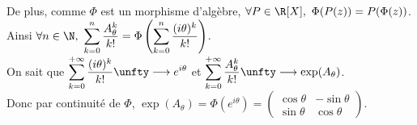 \documentclass[8pt]{book}
\begin{document}
\begin{enumerate}[leftmargin=*]
		De plus, comme $\Phi$ est un morphisme d'algèbre, $\forall P\in \R[X],\ \Phi(P(z))=P(\Phi(z))$. Ainsi $\forall n\in \N,\ \displaystyle\sum_{k=0}^n\frac{A_\theta^k}{k!}=\Phi\left(\sum_{k=0}^{n}\frac{(i\theta)^k}{k!}\right)$.\\
		On sait que $\displaystyle\sum_{k=0}^{+\infty}\frac{(i\theta)^k}{k!}\unfty\longrightarrow e^{i\theta}$ et $\displaystyle\sum_{k=0}^{+\infty}\frac{A_\theta^k}{k!}\unfty\longrightarrow\exp(A_\theta)$.\\
		Donc par continuité de $\Phi$, $\exp(A_\theta)=\Phi(e^{i\theta})=\begin{pmatrix}\cos\theta&-\sin\theta\\\sin\theta&\cos\theta\end{pmatrix}$.
	\end{enumerate}
	
\end{document}

